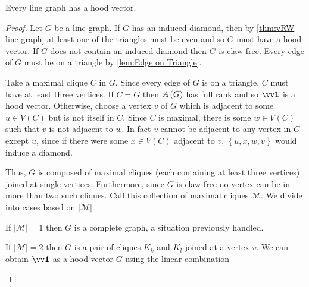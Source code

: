 \begin{theorem}\label{thm:Line Graphs work}Every line graph has a hood vector.
\end{theorem}
\begin{proof}
	Let $G$ be a line graph. If $G$ has an induced diamond, then by \autoref{thm:vRW line graph} at least one of the triangles must be even and so $G$ must have a hood vector. If $G$ does not contain an induced diamond then $G$ is claw-free. Every edge of $G$ must be on a triangle by \autoref{lem:Edge on Triangle}.

Take a maximal clique $C$ in $G$. Since every edge of $G$ is on a triangle, $C$ must have at least three vertices. If $C=G$ then $A\left(G\right)$ has full rank and so $\onevect$ is a hood vector. Otherwise, choose a vertex $v$ of $G$ which is adjacent to some $u\in V\left(C\right)$ but is not itself in $C$. Since $C$ is maximal, there is some $w \in V\left(C\right)$ such that $v$ is not adjacent to $w$. In fact $v$ cannot be adjacent to any vertex in $C$ except $u$, since if there were some $x\in V\left(C\right)$ adjacent to $v$, $\left\{u,x,w,v\right\}$ would induce a diamond.
\begin{center}\end{center}

Thus, $G$ is composed of maximal cliques (each containing at least three vertices) joined at single vertices. Furthermore, since $G$ is claw-free no vertex can be in more than two such cliques. Call this collection of maximal cliques $\mathcal{M}$. We divide into cases based on $\left|\mathcal{M}\right|$.

\begin{case}
	If $\left|\mathcal{M}\right|=1$ then $G$ is a complete graph, a situation previously handled.
\end{case}

\begin{case}
	If $\left|\mathcal{M}\right|=2$ then $G$ is a pair of cliques $K_k$ and $K_l$ joined at a vertex $v$. We can obtain $\onevect$ as a hood vector $G$ using the linear combination


\end{case}
\end{proof}
